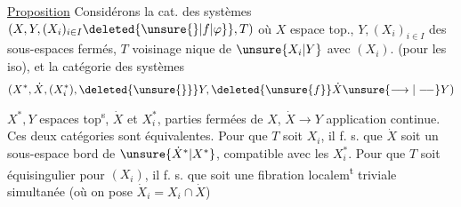 \uline{Proposition} Considérons la cat. des
systèmes $(X,Y,(X_i)_{i\in I}\deleted{\unsure{\}|f|\varphi}},T)$ où
$X$ espace top., $Y,(X_i)_{i\in I}$ des sous-espaces fermés,
$T$ voisinage nique de $\unsure{X_i|Y}$
 avec
$(X_i)$. (pour les iso), et la catégorie
des systèmes
\[
(X^*,\dot X,(X_i^*),\deleted{\unsure{\}}}Y,
\deleted{\unsure{f}}\dot X\unsure{\longrightarrow|\mathrel{\relbar\joinrel\relbar}}Y)
\]
$X^*,Y$ espaces top\textsuperscript{s}, $\dot X$ et $X_i^*$, parties fermées de $X$,
$\dot X\longrightarrow Y$ application continue. Ces deux
catégories sont équivalentes.
Pour que $T$
soit \uline{} 
 $X_i$,
il f.  s. que $\dot X$ soit un sous-espace bord
de $\unsure{\dot X^*|X^*}$,  compatible avec les $X_i^*$.
Pour que $T$ soit équisingulier pour
$(X_i)$, il f.  s. que
soit une fibration localem\textsuperscript{t} triviale
simultanée (où on pose $\dot X_i=X_i\cap\dot X$)
